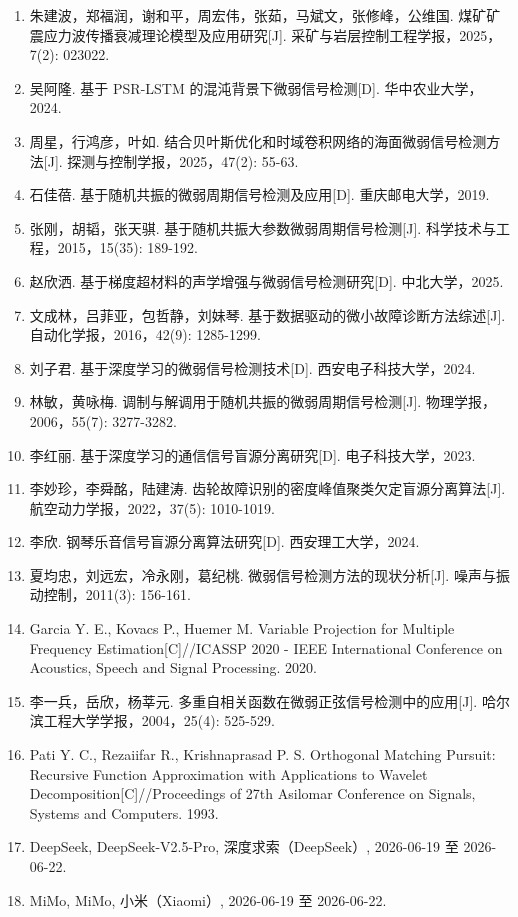 \documentclass[UTF8,a4paper,12pt]{ctexart}
\numberwithin{figure}{section}
\numberwithin{table}{section}
\begin{document}
\begin{enumerate}
\renewcommand{\labelenumi}{[\arabic{enumi}]}
\item 朱建波，郑福润，谢和平，周宏伟，张茹，马斌文，张修峰，公维国. 煤矿矿震应力波传播衰减理论模型及应用研究[J]. 采矿与岩层控制工程学报，2025，7(2): 023022.
\item 吴阿隆. 基于 PSR-LSTM 的混沌背景下微弱信号检测[D]. 华中农业大学，2024.
\item 周星，行鸿彦，叶如. 结合贝叶斯优化和时域卷积网络的海面微弱信号检测方法[J]. 探测与控制学报，2025，47(2): 55-63.
\item 石佳蓓. 基于随机共振的微弱周期信号检测及应用[D]. 重庆邮电大学，2019.
\item 张刚，胡韬，张天骐. 基于随机共振大参数微弱周期信号检测[J]. 科学技术与工程，2015，15(35): 189-192.
\item 赵欣洒. 基于梯度超材料的声学增强与微弱信号检测研究[D]. 中北大学，2025.
\item 文成林，吕菲亚，包哲静，刘妹琴. 基于数据驱动的微小故障诊断方法综述[J]. 自动化学报，2016，42(9): 1285-1299.
\item 刘子君. 基于深度学习的微弱信号检测技术[D]. 西安电子科技大学，2024.
\item 林敏，黄咏梅. 调制与解调用于随机共振的微弱周期信号检测[J]. 物理学报，2006，55(7): 3277-3282.
\item 李红丽. 基于深度学习的通信信号盲源分离研究[D]. 电子科技大学，2023.
\item 李妙珍，李舜酩，陆建涛. 齿轮故障识别的密度峰值聚类欠定盲源分离算法[J]. 航空动力学报，2022，37(5): 1010-1019.
\item 李欣. 钢琴乐音信号盲源分离算法研究[D]. 西安理工大学，2024.
\item 夏均忠，刘远宏，冷永刚，葛纪桃. 微弱信号检测方法的现状分析[J]. 噪声与振动控制，2011(3): 156-161.
\item Garcia Y. E., Kovacs P., Huemer M. Variable Projection for Multiple Frequency Estimation[C]//ICASSP 2020 - IEEE International Conference on Acoustics, Speech and Signal Processing. 2020.
\item 李一兵，岳欣，杨莘元. 多重自相关函数在微弱正弦信号检测中的应用[J]. 哈尔滨工程大学学报，2004，25(4): 525-529.
\item Pati Y. C., Rezaiifar R., Krishnaprasad P. S. Orthogonal Matching Pursuit: Recursive Function Approximation with Applications to Wavelet Decomposition[C]//Proceedings of 27th Asilomar Conference on Signals, Systems and Computers. 1993.
\item DeepSeek, DeepSeek-V2.5-Pro, 深度求索（DeepSeek）, 2026-06-19 至 2026-06-22.
\item MiMo, MiMo, 小米（Xiaomi）, 2026-06-19 至 2026-06-22.
\end{enumerate}
\end{document}
